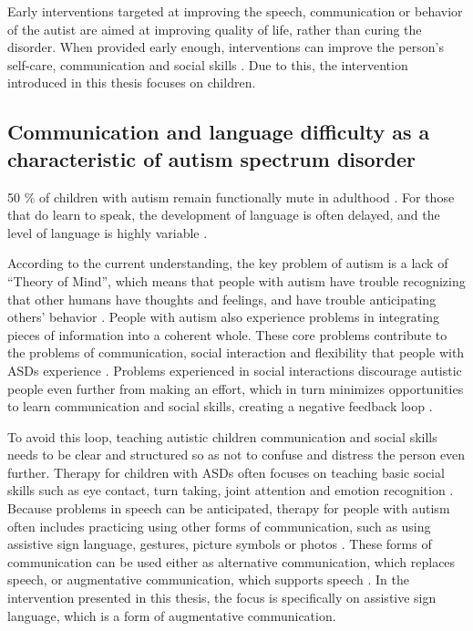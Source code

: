Early interventions targeted at improving the speech, communication or behavior of the autist are aimed at improving quality of life, rather than curing the disorder. When provided early enough, interventions can improve the person's self-care, communication and social skills \cite{tetzchner}. Due to this, the intervention introduced in this thesis focuses on children.


\subsection[Communication and language difficulty as a characteristic of autism spectrum disorder]{Communication and language difficulty as a \\characteristic of autism spectrum disorder}

50 \% of children with autism remain functionally mute in adulthood \cite{puheSuomi, peeters1999autism}. For those that do learn to speak, the development of language is often delayed, and the level of language is highly variable \cite{puheSuomi}.

According to the current understanding, the key problem of autism is a lack of ``Theory of Mind'', which means that people with autism have trouble recognizing that other humans have thoughts and feelings, and have trouble anticipating others' behavior \cite{baron1985does, frith2003autism}. People with autism also experience problems in integrating pieces of information into a coherent whole. These core problems contribute to the problems of communication, social interaction and flexibility that people with ASDs experience \cite{frith2003autism}. Problems experienced in social interactions discourage autistic people even further from making an effort, which in turn minimizes opportunities to learn communication and social skills, creating a negative feedback loop \cite{autismi}.

To avoid this loop, teaching autistic children communication and social skills needs to be clear and structured so as not to confuse and distress the person even further. Therapy for children with ASDs often focuses on teaching basic social skills such as eye contact, turn taking, joint attention and emotion recognition \cite{autismi}. Because problems in speech can be anticipated, therapy for people with autism often includes practicing using other forms of communication, such as using assistive sign language, gestures, picture symbols or photos \cite{puheSuomi, tincani2004comparing}. These forms of communication can be used either as alternative communication, which replaces speech, or augmentative communication, which supports speech \cite{puheSuomi}. In the intervention presented in this thesis, the focus is specifically on assistive sign language, which is a form of augmentative communication.


